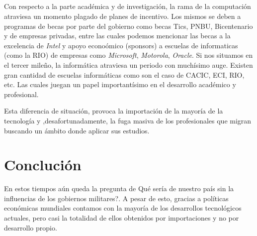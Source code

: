 \documentclass[%
 	final,
%
	notitlepage,
	narroweqnarray,
	inline,
 	twoside,
	]{ieee}
\begin{document}
\subsection*{}
Con respecto a la parte acad\'emica y de investigaci\'on, la rama de la computaci\'on atraviesa un momento plagado de planes de incentivo. Los mismos se deben a programas de becas por parte del gobierno como becas Tics, PNBU, Bicentenario y de empresas privadas, entre las cuales podemos mencionar las becas a la excelencia de \textit{Intel} y apoyo econo\'omico (sponsors) a escuelas de informaticas (como la RIO) de empresas como \textit{Microsoft}, \textit{Motorola}, \textit{Oracle}.
Si nos situamos en el tercer mile\~no, la inform\'atica atraviesa un periodo con much\'isimo auge. Existen gran cantidad de escuelas informáticas como son el caso de CACIC, ECI, RIO, etc. Las cuales juegan un papel important\'isimo en el desarrollo acad\'emico y profesional.

Esta diferencia de situaci\'on, provoca la importaci\'on de la mayor\'ia de la tecnolog\'ia y ,desafortunadamente, la fuga masiva de los profesionales que migran buscando un \'ambito donde aplicar sus estudios.






\section{Concluci\'on}
En estos tiempos a\'un queda la pregunta de \textquestiondown Qu\'e ser\'ia de nuestro pa\'is sin la influencias de los gobiernos militares?.
A pesar de esto, gracias a pol\'iticas econ\'omicas mundiales contamos con la mayor\'ia de los desarrollos tecnol\'ogicos actuales, pero casi la totalidad de ellos obtenidos por importaciones y no por desarrollo propio.
\end{document}
